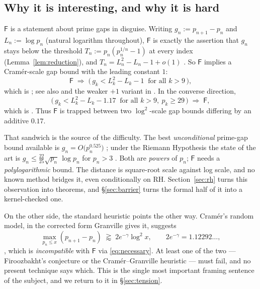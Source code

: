 \documentclass[11pt,a4paper]{article}
\theoremstyle{plain}
\theoremstyle{definition}
\theoremstyle{remark}
\newcommand{\Fb}{\mathsf{F}}
\begin{document}
\subsection{Why it is interesting, and why it is hard}

$\Fb$ is a statement about prime gaps in disguise. Writing $g_n := p_{n+1} - p_n$ and
$L_n := \log p_n$ (natural logarithm throughout), $\Fb$ is exactly the assertion that
$g_n$ stays below the threshold $T_n := p_n(p_n^{1/n} - 1)$ at every index
(Lemma~\ref{lem:reduction}), and $T_n = L_n^2 - L_n - 1 + o(1)$
\cite[\S5, Thm.~5]{kourbatov2015bounds}. So $\Fb$ implies a Cram\'er-scale gap bound with
the leading constant $1$:
\begin{equation}
\label{eq:necessary}
\Fb \;\Longrightarrow\; \bigl(\, g_k < L_k^2 - L_k - 1 \ \text{ for all } k > 9 \,\bigr),
\end{equation}
which is \cite[\S2, Thm.~1]{kourbatov2015bounds}; see also
\cite[Thm.~2.2]{ferreira2017consequences} and the weaker $+1$ variant in
\cite[\S1]{sun2013sequence}. In the converse direction,
\begin{equation}
\label{eq:sufficient}
\bigl(\, g_k < L_k^2 - L_k - 1.17 \ \text{ for all } k > 9,\ p_k \ge 29 \,\bigr)
\;\Longrightarrow\; \Fb ,
\end{equation}
which is \cite[\S4, Thm.~3]{kourbatov2015bounds}. Thus $\Fb$ is trapped between two
$\log^2$-scale gap bounds differing by an additive $0.17$.

That sandwich is the source of the difficulty. The best \emph{unconditional} prime-gap bound
available is $g_n = O\bigl(p_n^{0.525}\bigr)$ \cite{baker2001difference}; under the Riemann
Hypothesis the state of the art is $g_n \le \tfrac{22}{25}\sqrt{p_n}\,\log p_n$ for $p_n > 3$
\cite[\S1.2, Thm.~5]{carneiro2019fourier}. Both are \emph{powers} of $p_n$; $\Fb$ needs a
\emph{polylogarithmic} bound. The distance is square-root scale against log scale, and no
known method bridges it, even conditionally on RH. Section~\ref{sec:rh} turns this
observation into theorems, and \S\ref{sec:barrier} turns the formal half of it into a
kernel-checked one.

On the other side, the standard heuristic points the other way. Cram\'er's random model, in
the corrected form Granville gives it, suggests
\[
\max_{p_n \le x}(p_{n+1}-p_n) \;\gtrapprox\; 2e^{-\gamma}\log^2 x,
\qquad 2e^{-\gamma} = 1.12292\ldots,
\]
\cite[preprint p.~12, after eq.~(20)]{granville1995cramer}, which is \emph{incompatible} with
$\Fb$ via \eqref{eq:necessary}. At least one of the two --- Firoozbakht's conjecture or the
Cram\'er--Granville heuristic --- must fail, and no present technique says which. This is
the single most important framing sentence of the subject, and we return to it in
\S\ref{sec:tension}.
\end{document}

